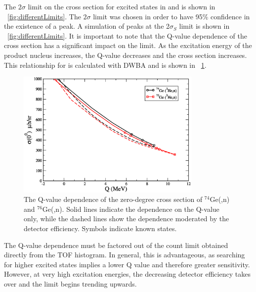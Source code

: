 The $2\sigma$ limit on the cross section for excited \zp states in  and  is shown in {\fig}~\ref{fig:differentLimits}.  The $2\sigma$ limit was chosen in order to have 95\% confidence in the existence of a peak.  A simulation of peaks at the 2$\sigma_S$ limit is shown in {\fig}~\ref{fig:differentLimits}.  It is important to note that the Q-value dependence of the cross section has a significant impact on the limit.  As the excitation energy of the product nucleus increases, the Q-value decreases and the cross section increases.  This relationship for \reaction is calculated with DWBA and is shown in {\fig}~\ref{fig:QvalDependence}.
\begin{figure}[!htbp]
\centering
\includegraphics[width=0.8\textwidth]{figures/SigmaVsQ.eps}
\caption[The Q-value dependence of the zero-degree cross section of $^{74}$Ge(,n) and $^{76}$Ge(,n).]{The Q-value dependence of the zero-degree cross section of $^{74}$Ge(,n) and $^{76}$Ge(,n).  Solid lines indicate the dependence on the Q-value only, while the dashed lines show the dependence moderated by the detector efficiency.  Symbols indicate known \zp states.}
\label{fig:QvalDependence}
\end{figure}
The Q-value dependence must be factored out of the count limit obtained directly from the TOF histogram.  In general, this is advantageous, as searching for higher excited \zp states implies a lower Q value and therefore greater sensitivity.  However, at very high excitation energies, the decreasing detector efficiency takes over and the limit begins trending upwards.
